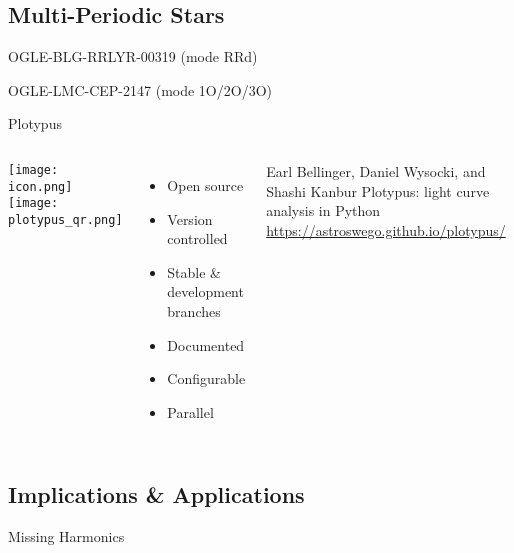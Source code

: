 \documentclass[serif,mathserif,professionalfont]{beamer}
\begin{document}
\subsection{Multi-Periodic Stars}
\begin{frame}{OGLE-BLG-RRLYR-00319 (mode RRd)}
\makebox[\textwidth][c]{}
\end{frame}

\begin{frame}{OGLE-LMC-CEP-2147 (mode 1O/2O/3O)}
\makebox[\textwidth][c]{}
\end{frame}

\begin{frame}{Plotypus}
\begin{columns}[c]
\begin{columns}[c]
\texttt{[image: icon.png]} \\ %
\texttt{[image: plotypus\_qr.png]}
\begin{itemize}
\item Open source 
\item Version controlled 
\item Stable \& development branches 
\item Documented 
\item Configurable 
\item Parallel 
\end{itemize}
\end{columns}
\begin{thebibliography}{1}
  \beamertemplatearticlebibitems
    Earl Bellinger, Daniel Wysocki, and Shashi Kanbur
    \newblock Plotypus: light curve analysis in Python
    \newblock \url{https://astroswego.github.io/plotypus/}
\end{thebibliography}
\end{columns}
\end{frame}

\subsection{Implications \& Applications}
\begin{frame}{Missing Harmonics}
\makebox[\textwidth][c]{}
\end{frame}
\end{document}
